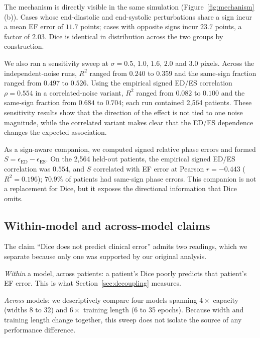 \documentclass[conference,a4paper]{IEEEtran}
\begin{document}
The mechanism is directly visible in the same simulation
(Figure~\ref{fig:mechanism}(b)). Cases whose end-diastolic and end-systolic perturbations
share a sign incur a mean EF error of $11.7$ points; cases with opposite signs incur
$23.7$ points, a factor of $2.03$. Dice is identical in distribution across the two groups
by construction.

We also ran a sensitivity sweep at $\sigma=0.5$, $1.0$, $1.6$, $2.0$ and $3.0$ pixels.
Across the independent-noise runs, $R^2$ ranged from $0.240$ to $0.359$ and the
same-sign fraction ranged from $0.497$ to $0.526$. Using the empirical signed ED/ES
correlation $\rho=0.554$ in a correlated-noise variant, $R^2$ ranged from $0.082$ to
$0.100$ and the same-sign fraction from $0.684$ to $0.704$; each run contained 2,564
patients. These sensitivity results show that the direction of the effect is not tied to
one noise magnitude, while the correlated variant makes clear that the ED/ES dependence
changes the expected association.

As a sign-aware companion, we computed signed relative phase errors and formed
$S=\epsilon_{\mathrm{ED}}-\epsilon_{\mathrm{ES}}$. On the 2,564 held-out patients, the
empirical signed ED/ES correlation was $0.554$, and $S$ correlated with EF error at
Pearson $r=-0.443$ ($R^2=0.196$); $70.9\%$ of patients had same-sign phase errors. This
companion is not a replacement for Dice, but it exposes the directional information that
Dice omits.

\subsection{Within-model and across-model claims}
The claim ``Dice does not predict clinical error'' admits two readings, which we separate
because only one was supported by our original analysis.

\emph{Within} a model, across patients: a patient's Dice poorly predicts that patient's EF
error. This is what Section~\ref{sec:decoupling} measures.

\emph{Across} models: we descriptively compare four models spanning $4\times$ capacity
(widths 8 to 32) and $6\times$ training length (6 to 35 epochs). Because width and training
length change together, this sweep does not isolate the source of any performance difference.
\end{document}
